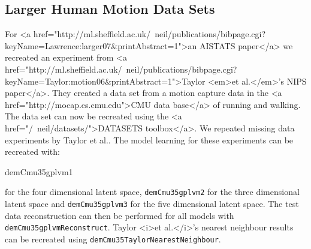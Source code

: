 \subsection{Larger Human Motion Data Sets}

For <a href="http://ml.sheffield.ac.uk/~neil/publications/bibpage.cgi?keyName=Lawrence:larger07&printAbstract=1">an AISTATS paper</a> we recreated an experiment from <a href="http://ml.sheffield.ac.uk/~neil/publications/bibpage.cgi?keyName=Taylor:motion06&printAbstract=1">Taylor <em>et al.</em>'s NIPS paper</a>. They created a data set from a motion capture data in the <a href="http://mocap.cs.cmu.edu">CMU data base</a> of running and walking. The data set can now be recreated using the <a href="/~neil/datasets/">DATASETS toolbox</a>. We repeated missing data experiments by Taylor et al.. The model learning for these experiments can be recreated with:

\begin{octave}
 demCmu35gplvm1
\end{octave}

for the four dimensional latent space, \texttt{demCmu35gplvm2} for the three dimensional latent space and \texttt{demCmu35gplvm3} for the five dimensional latent space. The test data reconstruction can then be performed for all models with \texttt{demCmu35gplvmReconstruct}. Taylor <i>et al.</i>'s nearest neighbour results can be recreated using \texttt{demCmu35TaylorNearestNeighbour}.

